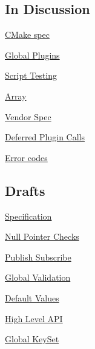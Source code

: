\subsection*{In Discussion}


\begin{DoxyItemize}
\item \hyperlink{doc_decisions_cmake_spec_md}{C\+Make spec}
\item \hyperlink{doc_decisions_global_plugins_md}{Global Plugins}
\item \hyperlink{doc_decisions_script_testing_md}{Script Testing}
\item \hyperlink{doc_decisions_array_md}{Array}
\item \hyperlink{doc_decisions_vendor_spec_md}{Vendor Spec}
\item \hyperlink{doc_decisions_deferred_plugin_calls_md}{Deferred Plugin Calls}
\item \hyperlink{doc_decisions_error_codes_md}{Error codes}
\end{DoxyItemize}

\subsection*{Drafts}


\begin{DoxyItemize}
\item \hyperlink{doc_decisions_specification_md}{Specification}
\item \hyperlink{doc_decisions_null_pointer_checks_md}{Null Pointer Checks}
\item \hyperlink{doc_decisions_pubsub_md}{Publish Subscribe}
\item \hyperlink{doc_decisions_global_validation_md}{Global Validation}
\item \hyperlink{doc_decisions_default_values_md}{Default Values}
\item \hyperlink{doc_decisions_high_level_api_md}{High Level A\+PI}
\item \hyperlink{doc_decisions_global_keyset_md}{Global Key\+Set} 
\end{DoxyItemize}
